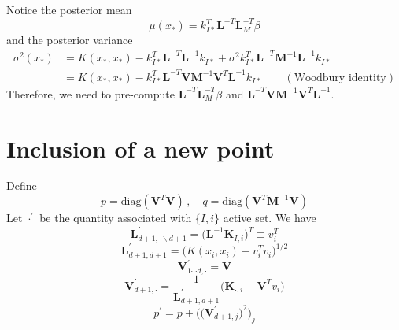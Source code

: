 \documentclass[a4paper,onecolumn]{article}
\begin{document}
Notice the posterior mean
$$
    \mu(x_*) = k_{I*}^T \mathbf{L}^{-T}\mathbf{L}_M^{-T} \beta
$$
and the posterior variance
\begin{equation*}\begin{split}
    \sigma^2 (x_*) &= K(x_*, x_*) - k_{I*}^T \mathbf{L}^{-T} \mathbf{L}^{-1} k_{I*} + \sigma^2 k_{I*}^T \mathbf{L}^{-T} \mathbf{M}^{-1} \mathbf{L}^{-1} k_{I*}\\
    &=  K(x_*, x_*) - k_{I*}^T \mathbf{L}^{-T} \mathbf{V} \mathbf{M}^{-1} \mathbf{V}^T \mathbf{L}^{-1} k_{I*} \qquad (\textrm{Woodbury identity})
\end{split}\end{equation*}
Therefore, we need to pre-compute
$ \mathbf{L}^{-T}\mathbf{L}_M^{-T} \beta$ and $ \mathbf{L}^{-T} \mathbf{V} \mathbf{M}^{-1} \mathbf{V}^T \mathbf{L}^{-1}$.\\

\section{Inclusion of a new point}
Define
$$
    {p} = \textrm{diag}(\mathbf{V}^T \mathbf{V})\,, \quad {q} = \textrm{diag}(\mathbf{V}^T \mathbf{M}^{-1}\mathbf{V})
$$
Let $\cdot^\prime$ be the quantity associated with $\{I,i\}$ active set. We have
$$
    \mathbf{L}^\prime_{d+1, \cdot\backslash d+1} = \big(\mathbf{L}^{-1} \mathbf{K}_{I,i}\big)^T \equiv v_i^T
$$
$$
    \mathbf{L}^\prime_{d+1, d+1} = \big( K(x_i, x_i) - v_i^T v_i\big)^{1/2}
$$
$$
    \mathbf{V}^\prime_{1\cdots d,\cdot} = \mathbf{V}
$$
$$
    \mathbf{V}^\prime_{d+1,\cdot} = \frac{1}{\mathbf{L}^\prime_{d+1,d+1}}\big( \mathbf{K}_{\cdot,i} - \mathbf{V}^T v_i \big) 
$$
$$
    p^\prime = p + \Big(\big(\mathbf{V}^\prime_{d+1,j}\big)^2\Big)_j
$$
\end{document}
